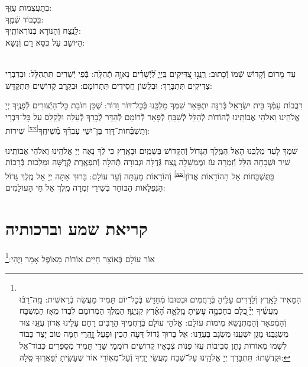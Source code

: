 \documentclass[twoside, openany, parskip=half, 11pt]{book}
\begin{document}

בְּֿתַעֲצֻמוֹת עֻזֶּֽךָ:\\
בִּכְבוֹד שְֿׁמֶֽךָ:\\
לָנֶֽצַח וְֿהַנּוֹרָא בְּֿנוֹרְֿאוֹתֶֽיךָ:\\
הַיּוֹשֵׁב עַל כִּסֵּא רָם וְֿנִשָּׂא:

\\
עַד מָרוֹם וְֿקָדוֹשׁ שְֿׁמוֹ וְֿכָתוּב: רַֽנֲנ֣וּ צַ֭דִּיקִים בַּֽיְיָ֑ לַ֝יְֿשָׁרִ֗ים נָאוָ֥ה תְֿהִלָּֽה: בְּֿפִי יְֿשָׁרִים תִּתְהַלָּל: וּבְדִבְרֵי צַדִּיקִים תִּתְבָּרַךְ: וּבִלְשׁוֹן חֲסִידִים תִּתְרוֹמָם: וּבְקֶֽרֶב קְֿדוֹשִׁים תִּתְקַדָּשׁ:

רִבֲבוֹת עַמְּֿךָ בֵּית יִשְׂרָאֵל בְּֿרִנָּה יִתְפָּאַר שִׁמְךָ מַלְכֵּֽנוּ בְּֿכׇל־דּוֹר וָדוֹר: שֶׁכֵּן חוֹבַת כׇּל־הַיְֿצוּרִים לְֿפָנֶֽיךָ יְיָ אֱלֹהֵֽינוּ וֵאלֹהֵי אֲבוֹתֵֽינוּ לְֿהוֹדוֹת לְֿהַלֵּל לְֿשַׁבֵּֽחַ לְֿפָאֵר לְֿרוֹמֵם לְֿהַדֵּר לְֿבָרֵךְ לְֿעַלֵּה וּלְקַלֵּס עַל כׇּל־דִּבְרֵי שִׁירוֹת \textsuperscript{\ref{xx}}וְתֻשְׁבְּֿחוֹת־דָּוִד בֶּן־יִשַׁי עַבְדְּֿךָ מְֿשִׁיחֶֽךָ:


שִׁמְךָ לָעַד מַלְכֵּֽנוּ הָאֵל הַמֶּֽלֶךְ הַגָּדוֹל וְֿהַקָּדוֹשׁ בַּשָׁמַֽיִם וּבָאָֽרֶץ כִּי לְֿךָ נָאֶה יְיָ אֱלֹהֵֽינוּ וֵאלֹהֵי אֲבוֹתֵֽינוּ שִׁיר וּשְׁבָחָה הַלֵּל וְֿזִמְרָה עֹז וּמֶמְשָׁלָה נֶֽצַח גְּֿדֻלָּה וּגְבוּרָה תְּֿהִלָּה וְֿתִפְאֶֽרֶת קְֿדֻשָּׁה וּמַלְכוּת בְּֿרָכוֹת וְֿהוֹדָאוֹת מֵעַתָּה וְֿעַד עוֹלָם:
בָּרוּךְ אַתָּה יְיָ אֵל מֶֽלֶךְ גָּדוֹל \textsuperscript{\ref{xx}}בַּתֻּשְׁבָּחוֹת אֵל הַהוֹדָאוֹת אֲדוֹן הַנִּפְלָאוֹת הַבּוֹחֵר בְּֿשִׁירֵי זִמְרָה מֶֽלֶךְ אֵל חַי הָעוֹלָמִים:

\halfkaddish

\section*{ קריאת שמע וברכותיה }

\barachu


אוֹר עוֹלָם בְּֿאוֹצַר חַיִּים אוֹרוֹת מֵאוֹפֶל אָמַר וַיֶהִי:\footnote{\\
הַמֵּאִיר לָאָֽרֶץ וְֿלַדָּרִים עָלֶֽיהָ בְּֿרַחֲמִים וּבְטוּבוֹ מְֿחַדֵּשׁ בְּֿכׇל־יוֹם תָּמִיד מַעֲשֵׂה בְֿרֵאשִׁית:
מָֽה־רַבּ֬וּ מַֽעֲשֶׂ֨יךָ יְיָ֗ ֖כֻּלָּם בְּֿחָכְֿמָ֣ה עָשִׂ֑יתָ מָֽלְֿאָ֥ה הָ֝אָ֗רֶץ קִנְיָנֶֽךָ׃ הַמֶּֽלֶךְ הַמְֿרוֹמָם לְֿבַדּוֹ מֵאָז הַמְֿשֻׁבָּח וְֿהַמְֿפֹאָר וְֿהַמִּתְנַשֵּׂא מִימוֹת עוֹלָם: אֱלֹהֵי עוֹלָם בְּֿרַחֲמֶיךָ הָרַבִּים רַחֵם עָלֵינוּ אֲדוֹן עֻזֵּֽנוּ צוּר מִשְׂגַּבֵּנוּ מָגֵן יִשְׁעֵֽנוּ מִשְׂגָּב בַּעֲדֵֽנוּ: אֵל בָּרוּךְ גְּֿדוֹל דֵּעָה הֵכִין וּפָעַל זׇׇׇׇָהֳרֵי חַמָּה טוֹב יָצַר כָּבוֹד לִשְׁמוֹ מְֿאוֹרוֹת נָתַן סְֿבִיבוֹת עֻזּוֹ פִּנּוֹת צְֿבָאָיו קְֿדוֹשִׁים רוֹמֲמֵי שַׁדַּי תָּמִיד מְֿסַפְּֿרִים כְּֿבוֹד־אֵל וּקְדֻשָׁתוֹ: תִּתְבָּרַךְ יְיָ אֱלֹהֵֽינוּ עַל־שֶׁבַח מַעֲשֵׂי יָדֶֽיךָ וְֿעַל־מְאֽוֹרֵי אוֹר שֶׁעָשִֽׂיתָ יְֿפָאֲרֽוּךָ סֶּֽלָה:
}
\end{document}
